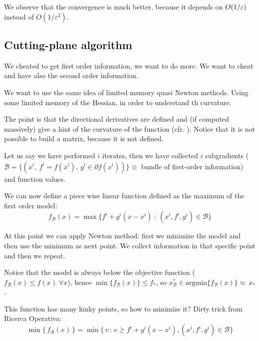 \documentclass[ComputationalMathematics.tex]{subfiles}
\begin{document}
We observe that the convergence is much better, because it depends on $O(1 / \varepsilon)$ instead of $O(1/\varepsilon^2)$.


\subsection{Cutting-plane algorithm}
We cheated to get first order information, we want to do more. We want to cheat and have also the second order information.

We want to use the same idea of limited memory quasi Newton methods. Using some limited memory of the Hessian, in order to understand th curvature.

The point is that the directional derivatives are defined and (if computed massively) give a hint of the curvature of the function (cfr. ).
Notice that it is not possible to build a matrix, because it is not defined.


Let us say we have performed $i$ iterates, then we have collected $i$ subgradients ($\mathscr{B} = \{(x^i,~f^i = f(x^i),~g^i \in \partial f(x^i))\} \equiv$ bundle of first-order information) and function values.

We can now define a piece wise linear function defined as the maximum of the first order model:
\[
  f_{\mathscr{B}}(x) = \max \{f^i + g^i (x - x^i)~:~(x^i, f^i, g^i) \in \mathscr{B}\}
\]

At this point we can apply Newton method: first we minimize the model and then use the minimum as next point. We collect information in that specific point and then we repeat.

 Notice that the model is always below the objective function ($f_{\mathscr{B}}(x) \leq f(x) \; \forall x$), hence $\min \{f_{\mathscr{B}}(x)\} \leq f_*$, so $x^*_{\mathscr{B}} \in \mbox{argmin} \{f_{\mathscr{B}}(x) \} \approx~x_*$.

 This function has many kinky points, so how to minimize it?
Dirty trick from Ricerca Operativa: 
\[
  \min \{ \, f_{\mathscr{B}}(x) \, \} = \min \{ \, v \,:\, v \geq f^i + g^i (x - x^i), (x^i,f^i,g^i) \in \mathscr{B}\}
\]
\end{document}
